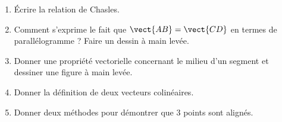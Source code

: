 
\begin{exercice}\label{exosmath-0056}

    \begin{enumerate}
        \item
            Écrire la relation de Chasles.
        \item
            Comment s'exprime le fait que \( \vect{ AB }=\vect{ CD }\) en termes de parallélogramme ? Faire un dessin à main levée.
        \item
            Donner une propriété vectorielle concernant le milieu d'un segment et dessiner une figure à main levée.
        \item
            Donner la définition de deux vecteurs colinéaires.
        \item
            Donner deux méthodes pour démontrer que \( 3\) points sont alignés.
    \end{enumerate}

\end{exercice}
